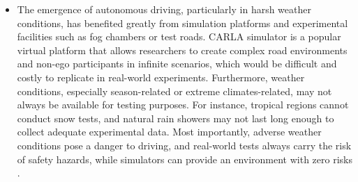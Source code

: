 \documentclass[rnd]{mas_proposal}
\begin{document}
\begin{itemize}
      \item The emergence of autonomous driving, particularly in harsh weather conditions, has benefited greatly from simulation platforms and experimental facilities such as fog chambers or test roads. CARLA simulator \cite{dosovitskiy2017carla} is a popular virtual platform that allows researchers to create complex road environments and non-ego participants in infinite scenarios, which would be difficult and costly to replicate in real-world experiments. Furthermore, weather conditions, especially season-related or extreme climates-related, may not always be available for testing purposes. For instance, tropical regions cannot conduct snow tests, and natural rain showers may not last long enough to collect adequate experimental data. Most importantly, adverse weather conditions pose a danger to driving, and real-world tests always carry the risk of safety hazards, while simulators can provide an environment with zero risks \cite{Zhang2021Dec}.

      

\end{itemize}
\end{document}
